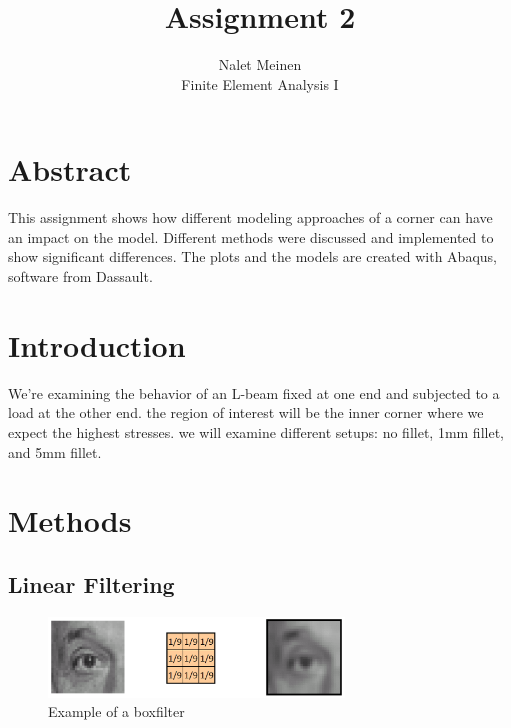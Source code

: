 \documentclass[12pt]{article}
\begin{document}


\title{Assignment 2}%
\author{Nalet Meinen\\ %
Finite Element Analysis I
}

\maketitle
\section*{Abstract}
This assignment shows how different modeling approaches of a corner can have 
an impact on the model. Different methods were discussed and implemented to show 
significant differences. The plots and the models are created with Abaqus, 
software from Dassault.
\pagebreak
\tableofcontents
\pagebreak
\section{Introduction}
We're examining the behavior of an L-beam fixed at one end and subjected 
to a load at the other end. the region of interest will be the inner 
corner where we expect the highest stresses. we will examine different 
setups: no fillet, 1mm fillet, and 5mm fillet.


\section{Methods}

\subsection{Linear Filtering}
\begin{figure}[!htb]
  \centering
  \includegraphics[width=0.7\textwidth]{pics/linear_filtering}
  \caption{Example of a boxfilter}
  \label{fig:linear_filtering}
\end{figure}
\end{document}
